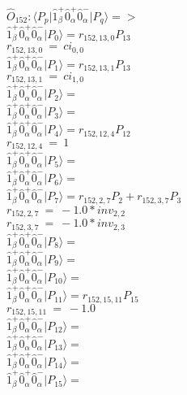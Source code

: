 \documentclass[14pt]{article}
\begin{document}
    $\hat{O}_{152}:  \langle{P_p}\vert \hat{1}_{\beta}^{+}\hat{0}_{\alpha}^{+}\hat{0}_{\alpha}^{-} \vert{P_q}\rangle => $ \\ 
    $ \hat{1}_{\beta}^{+}\hat{0}_{\alpha}^{+}\hat{0}_{\alpha}^{-} \vert{P_{0}}\rangle = {r}_{152,13,0}P_{13} $ \\ 
    ${r}_{152,13,0}\ =\ {ci}_{0,0} $ \\ 
    $ \hat{1}_{\beta}^{+}\hat{0}_{\alpha}^{+}\hat{0}_{\alpha}^{-} \vert{P_{1}}\rangle = {r}_{152,13,1}P_{13} $ \\ 
    ${r}_{152,13,1}\ =\ {ci}_{1,0} $ \\ 
    $ \hat{1}_{\beta}^{+}\hat{0}_{\alpha}^{+}\hat{0}_{\alpha}^{-} \vert{P_{2}}\rangle =  $ \\ 
    $ \hat{1}_{\beta}^{+}\hat{0}_{\alpha}^{+}\hat{0}_{\alpha}^{-} \vert{P_{3}}\rangle =  $ \\ 
    $ \hat{1}_{\beta}^{+}\hat{0}_{\alpha}^{+}\hat{0}_{\alpha}^{-} \vert{P_{4}}\rangle = {r}_{152,12,4}P_{12} $ \\ 
    ${r}_{152,12,4}\ =\ 1 $ \\ 
    $ \hat{1}_{\beta}^{+}\hat{0}_{\alpha}^{+}\hat{0}_{\alpha}^{-} \vert{P_{5}}\rangle =  $ \\ 
    $ \hat{1}_{\beta}^{+}\hat{0}_{\alpha}^{+}\hat{0}_{\alpha}^{-} \vert{P_{6}}\rangle =  $ \\ 
    $ \hat{1}_{\beta}^{+}\hat{0}_{\alpha}^{+}\hat{0}_{\alpha}^{-} \vert{P_{7}}\rangle = {r}_{152,2,7}P_{2}+{r}_{152,3,7}P_{3} $ \\ 
    ${r}_{152,2,7}\ =\ -1.0*{inv}_{2,2} $ \\ 
    ${r}_{152,3,7}\ =\ -1.0*{inv}_{2,3} $ \\ 
    $ \hat{1}_{\beta}^{+}\hat{0}_{\alpha}^{+}\hat{0}_{\alpha}^{-} \vert{P_{8}}\rangle =  $ \\ 
    $ \hat{1}_{\beta}^{+}\hat{0}_{\alpha}^{+}\hat{0}_{\alpha}^{-} \vert{P_{9}}\rangle =  $ \\ 
    $ \hat{1}_{\beta}^{+}\hat{0}_{\alpha}^{+}\hat{0}_{\alpha}^{-} \vert{P_{10}}\rangle =  $ \\ 
    $ \hat{1}_{\beta}^{+}\hat{0}_{\alpha}^{+}\hat{0}_{\alpha}^{-} \vert{P_{11}}\rangle = {r}_{152,15,11}P_{15} $ \\ 
    ${r}_{152,15,11}\ =\ -1.0 $ \\ 
    $ \hat{1}_{\beta}^{+}\hat{0}_{\alpha}^{+}\hat{0}_{\alpha}^{-} \vert{P_{12}}\rangle =  $ \\ 
    $ \hat{1}_{\beta}^{+}\hat{0}_{\alpha}^{+}\hat{0}_{\alpha}^{-} \vert{P_{13}}\rangle =  $ \\ 
    $ \hat{1}_{\beta}^{+}\hat{0}_{\alpha}^{+}\hat{0}_{\alpha}^{-} \vert{P_{14}}\rangle =  $ \\ 
    $ \hat{1}_{\beta}^{+}\hat{0}_{\alpha}^{+}\hat{0}_{\alpha}^{-} \vert{P_{15}}\rangle =  $ \\ 
    
\end{document}
